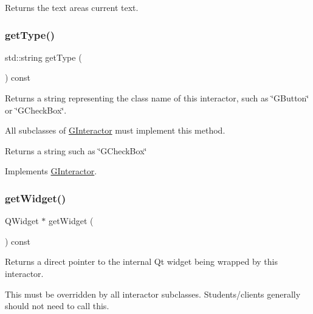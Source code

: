 Returns the text area\textquotesingle{}s current text. 

\mbox{\label{classGTextArea_a9896d58fcfebbf1025aeeb5b8b9ede80}} 
\subsubsection{\texorpdfstring{get\+Type()}{getType()}}
{\footnotesize\ttfamily std\+::string get\+Type (\begin{DoxyParamCaption}{ }\end{DoxyParamCaption}) const\hspace{0.3cm}{\ttfamily [virtual]}}



Returns a string representing the class name of this interactor, such as \char`\"{}\+G\+Button\char`\"{} or \char`\"{}\+G\+Check\+Box\char`\"{}. 

All subclasses of \mbox{\hyperlink{classGInteractor}{G\+Interactor}} must implement this method. \begin{DoxyReturn}{Returns}
a string such as \char`\"{}\+G\+Check\+Box\char`\"{} 
\end{DoxyReturn}


Implements \mbox{\hyperlink{classGInteractor_a799e073a127b428cc841086d42ea4fed}{G\+Interactor}}.

\mbox{\label{classGTextArea_a326ee51b5561f807df7b29a1c101f7fd}} 
\subsubsection{\texorpdfstring{get\+Widget()}{getWidget()}}
{\footnotesize\ttfamily Q\+Widget $\ast$ get\+Widget (\begin{DoxyParamCaption}{ }\end{DoxyParamCaption}) const\hspace{0.3cm}{\ttfamily [virtual]}}



Returns a direct pointer to the internal Qt widget being wrapped by this interactor. 

This must be overridden by all interactor subclasses. Students/clients generally should not need to call this. 

